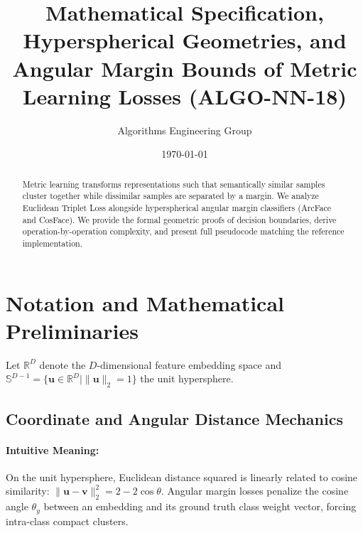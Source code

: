 \documentclass[11pt]{article}
\title{\textbf{Mathematical Specification, Hyperspherical Geometries, and Angular Margin Bounds of Metric Learning Losses (ALGO-NN-18)}}
\author{Algorithms Engineering Group}
\date{\today}
\begin{document}
\maketitle

\begin{abstract}
Metric learning transforms representations such that semantically similar samples cluster together while dissimilar samples are separated by a margin. We analyze Euclidean Triplet Loss alongside hyperspherical angular margin classifiers (ArcFace and CosFace). We provide the formal geometric proofs of decision boundaries, derive operation-by-operation complexity, and present full pseudocode matching the reference implementation.
\end{abstract}

\section{Notation and Mathematical Preliminaries}
\label{sec:notation}

Let $\mathbb{R}^D$ denote the $D$-dimensional feature embedding space and $\mathbb{S}^{D-1} = \{\mathbf{u} \in \mathbb{R}^D \mid \|\mathbf{u}\|_2 = 1\}$ the unit hypersphere.

\subsection{Coordinate and Angular Distance Mechanics}
\paragraph{Intuitive Meaning:} On the unit hypersphere, Euclidean distance squared is linearly related to cosine similarity: $\|\mathbf{u} - \mathbf{v}\|_2^2 = 2 - 2 \cos\theta$. Angular margin losses penalize the cosine angle $\theta_y$ between an embedding and its ground truth class weight vector, forcing intra-class compact clusters.
\end{document}
